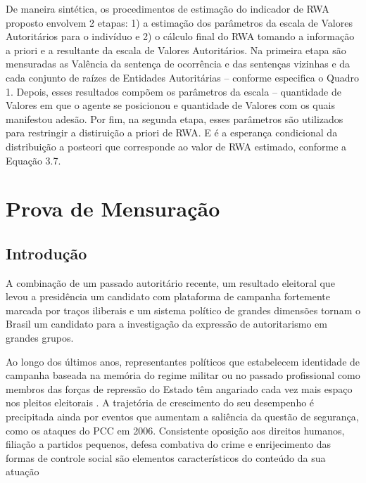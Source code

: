 \documentclass[
12pt,				%
openright,			%
twoside,			%
a4paper,			%
english,			%
french,				%
spanish,			%
brazil				%
]{abntex2}
\begin{document}
De maneira sintética, os procedimentos de estimação do indicador de RWA proposto envolvem 2 etapas: 1) a estimação dos parâmetros da escala de Valores Autoritários para o indivíduo e 2) o cálculo final do RWA tomando a informação a priori e a resultante da escala de Valores Autoritários. Na primeira etapa são mensuradas as Valência da sentença de ocorrência e das sentenças vizinhas e da cada conjunto de raízes de Entidades Autoritárias -- conforme especifica o Quadro 1. Depois, esses resultados compõem os parâmetros da escala -- quantidade de Valores em que o agente se posicionou e quantidade de Valores com os quais manifestou adesão. Por fim, na segunda etapa, esses parâmetros são utilizados para restringir a distiruição a priori de RWA. E é a esperança condicional da distribuição a posteori que corresponde ao valor de RWA estimado, conforme a Equação 3.7.

\chapter{Prova de Mensuração}\label{resultados}

\section{Introdução}

A combinação de um passado autoritário recente, um resultado eleitoral que levou a presidência um candidato com plataforma de campanha fortemente marcada por traços iliberais \cite{hunter2019bolsonaro} e um sistema político de grandes dimensões tornam o Brasil um candidato para a investigação da expressão de autoritarismo em grandes grupos.

Ao longo dos últimos anos, representantes políticos que estabelecem identidade de campanha baseada na memória do regime militar ou no passado profissional como membros das forças de repressão do Estado têm angariado cada vez mais espaço nos pleitos eleitorais \cite{berlatto2015candidatos, berlatto2016policia}. A trajetória de crescimento do seu desempenho é precipitada ainda por eventos que aumentam a saliência da questão de segurança, como os ataques do PCC em 2006. Consistente oposição aos direitos humanos, filiação a partidos pequenos, defesa combativa do crime e enrijecimento das formas de controle social são elementos característicos do conteúdo da sua atuação \cite{berlatto2015candidatos, berlatto2016policia, faganellobancada, faganello2017voto}
\end{document}
